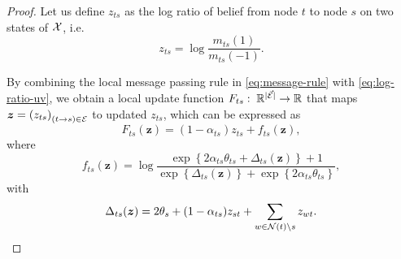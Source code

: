 \begin{proof}
  Let us define $z_{ts}$ as the log ratio of belief from node $t$ to node $s$ on two states of $\mathcal{X}$, i.e.
  \begin{equation}\label{eq:log-ratio-uv}
    z_{ts} = \log\frac{m_{ts}(1)}{m_{ts}(-1)}.
  \end{equation}

  By combining the local message passing rule in \eqref{eq:message-rule} with \eqref{eq:log-ratio-uv}, we obtain a local update function $F_{ts}: \; \mathbb{R}^{| \vec{\mathcal{E}} |} \rightarrow \mathbb{R}$ that maps $\bm{z} = \left( z_{ts} \right)_{(t \rightarrow s) \in \mathcal{E}}$ to updated $z_{ts}$, which can be expressed as
  \begin{equation}\label{eq:ratio-update}
    F_{ts}(\bm{z}) = (1-\alpha_{ts}) z_{ts} + f_{ts}(\bm{z}),
  \end{equation}
  where
  \begin{equation}
    f_{ts}(\bm{z}) = \log\frac{\exp\left\{ 2 \alpha_{ts} \theta_{ts} + \Delta_{ts}(\bm{z}) \right\}+1}
    {\exp\left\{ \Delta_{ts}(\bm{z}) \right\} +
      \exp\left\{ 2 \alpha_{ts} \theta_{ts} \right\}},
  \end{equation}
  with
  \begin{equation}
    \Delta_{ts}(\bm{z}) = 2 \theta_s + (1 - \alpha_{ts}) z_{st} + \sum_{w\in \mathcal{N}(t)\backslash s} z_{wt}.
  \end{equation}


\end{proof}

